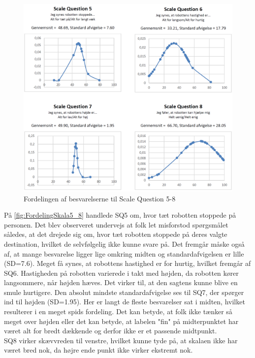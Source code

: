 %
\begin{figure}[H]
\centering
\includegraphics[width =\textwidth]{Figure/DatabehandlingSkalaer/FordelingSkala5_8} 
\caption{Fordelingen af besvarelserne til Scale Question 5-8}
\label{fig:FordelingSkala5_8}
\end{figure}
\noindent
%
På \autoref{fig:FordelingSkala5_8} handlede SQ5 om, hvor tæt robotten stoppede på personen. Det blev observeret undervejs at folk let misforstod spørgsmålet således, at det drejede sig om, hvor tæt robotten stoppede på deres valgte destination, hvilket de selvfølgelig ikke kunne svare på. Det fremgår måske også af, at mange besvarelse ligger lige omkring midten og standardafvigelsen er lille (SD=7.6). Meget få synes, at robottens hastighed er for hurtig, hvilket fremgår af SQ6.  Hastigheden på robotten varierede i takt med højden, da robotten kører langsommere, når højden hæves. Det virker til, at den sagtens kunne blive en smule hurtigere. Den absolut mindste standardafvigelse ses til SQ7, der spørger ind til højden (SD=1.95). Her er langt de fleste besvarelser sat i midten, hvilket resulterer i en meget spids fordeling. Det kan betyde, at folk ikke tænker så meget over højden eller det kan betyde, at labelen "fin" på midterpunktet har været alt for bredt dækkende og derfor ikke er et passende midtpunkt.\\
SQ8 virker skævvreden til venstre, hvilket kunne tyde på, at skalaen ikke har været bred nok, da højre ende punkt ikke virker ekstremt nok.
